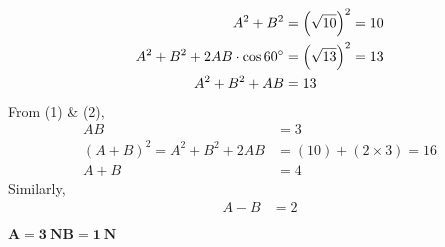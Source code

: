 \documentclass[12pt]{ipu-mechanics}
\begin{document}
    \begin{align}
        A^2 + B^2 &= \left(\sqrt{10}\right)^2 = 10\\
        A^2 + B^2 + 2AB\cdot\cos{60\degree} &= \left(\sqrt{13}\right)^2 = 13\nonumber\\
        A^2 + B^2 + AB &= 13
    \end{align}
    \hspace*{0.3\textwidth}From (1) \& (2),\vspace*{-5pt}
    \begin{align*}
        AB &= 3\\
        (A+B)^2 = A^2 + B^2 + 2AB &= (10) + (2\times{3}) = 16\\
        A+B &= 4
    \end{align*}
    \hspace*{0.3\textwidth}Similarly,\vspace*{-5pt}
    \begin{align*}
        A-B &= 2
    \end{align*}\vspace*{-20pt}
    \parbox{\textwidth}{\centering
        $\bm{\boxed{A = 3~\text{N}}\boxed{B = 1~\text{N}}}$
    }
\end{document}
